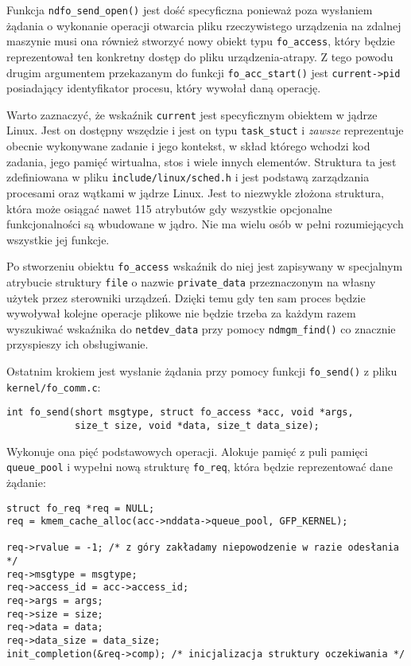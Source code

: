 \documentclass[10pt]{scrartcl}
\begin{document}
Funkcja \texttt{ndfo\_send\_open()} jest dość specyficzna ponieważ poza wysłaniem żądania o wykonanie operacji otwarcia pliku rzeczywistego urządzenia na zdalnej maszynie musi ona również stworzyć nowy obiekt typu \texttt{fo\_access}, który będzie reprezentował ten konkretny dostęp do pliku urządzenia-atrapy. Z tego powodu drugim argumentem przekazanym do funkcji \texttt{fo\_acc\_start()} jest \texttt{current-\textgreater{}pid} posiadający identyfikator procesu, który wywołał daną operację.

Warto zaznaczyć, że wskaźnik \texttt{current} jest specyficznym obiektem w jądrze Linux. Jest on dostępny wszędzie i jest on typu \texttt{task\_stuct} i \emph{zawsze} reprezentuje obecnie wykonywane zadanie i jego kontekst, w skład którego wchodzi kod zadania, jego pamięć wirtualna, stos i wiele innych elementów. Struktura ta jest zdefiniowana w pliku \texttt{include/linux/sched.h} i jest podstawą zarządzania procesami oraz wątkami w jądrze Linux. Jest to niezwykle złożona struktura, która może osiągać nawet 115 atrybutów gdy wszystkie opcjonalne funkcjonalności są wbudowane w jądro. Nie ma wielu osób w pełni rozumiejących wszystkie jej funkcje.

Po stworzeniu obiektu \texttt{fo\_access} wskaźnik do niej jest zapisywany w specjalnym atrybucie struktury \texttt{file} o nazwie \texttt{private\_data} przeznaczonym na własny użytek przez sterowniki urządzeń. Dzięki temu gdy ten sam proces będzie wywoływał kolejne operacje plikowe nie będzie trzeba za każdym razem wyszukiwać wskaźnika do \texttt{netdev\_data} przy pomocy \texttt{ndmgm\_find()} co znacznie przyspieszy ich obsługiwanie.

Ostatnim krokiem jest wysłanie żądania przy pomocy funkcji \texttt{fo\_send()} z pliku \texttt{kernel/fo\_comm.c}:

\begin{verbatim}
int fo_send(short msgtype, struct fo_access *acc, void *args,
            size_t size, void *data, size_t data_size);
\end{verbatim}

Wykonuje ona pięć podstawowych operacji. Alokuje pamięć z puli pamięci \texttt{queue\_pool} i wypełni nową strukturę \texttt{fo\_req}, która będzie reprezentować dane żądanie:

\begin{verbatim}
struct fo_req *req = NULL;
req = kmem_cache_alloc(acc->nddata->queue_pool, GFP_KERNEL);

req->rvalue = -1; /* z góry zakładamy niepowodzenie w razie odesłania */
req->msgtype = msgtype;
req->access_id = acc->access_id;
req->args = args;
req->size = size;
req->data = data;
req->data_size = data_size;
init_completion(&req->comp); /* inicjalizacja struktury oczekiwania */
\end{verbatim}
\end{document}
